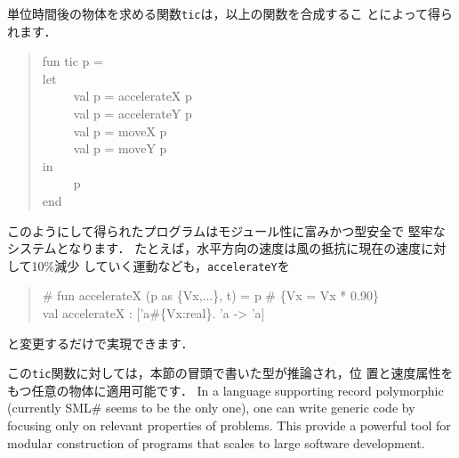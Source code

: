 \documentclass{jbook}
\newcommand{\smlsharp}{SML\#}
\newcommand{\myem}{\ \ \ \ \  }
\begin{document}
	単位時間後の物体を求める関数{\tt tic}は，以上の関数を合成するこ
とによって得られます．
\begin{tt}\begin{quote}
fun tic p =\\
let\\
\myem  val p = accelerateX p\\
\myem  val p = accelerateY p\\
\myem  val p = moveX p\\
\myem  val p = moveY p\\
in\\
\myem  p\\
end
\end{quote}\end{tt}
	このようにして得られたプログラムはモジュール性に富みかつ型安全で
堅牢なシステムとなります．
	たとえば，水平方向の速度は風の抵抗に現在の速度に対して10\%減少
していく運動なども，{\tt accelerateY}を
\begin{tt}\begin{quote}
\# fun accelerateX (p as \{Vx,...\}, t) = p \# \{Vx = Vx * 0.90\}\\
val accelerateX : ['a\#\{Vx:real\}. 'a -> 'a]\\
\end{quote}\end{tt}
と変更するだけで実現できます．

	この{\tt tic}関数に対しては，本節の冒頭で書いた型が推論され，位
置と速度属性をもつ任意の物体に適用可能です．
\else%
	In a language supporting record polymorphic (currently
\smlsharp{} seems to be the only one), one can write generic code by
focusing only on relevant properties of problems.
	This provide a powerful tool for modular construction of
programs that scales to large software development.
	
\end{document}
